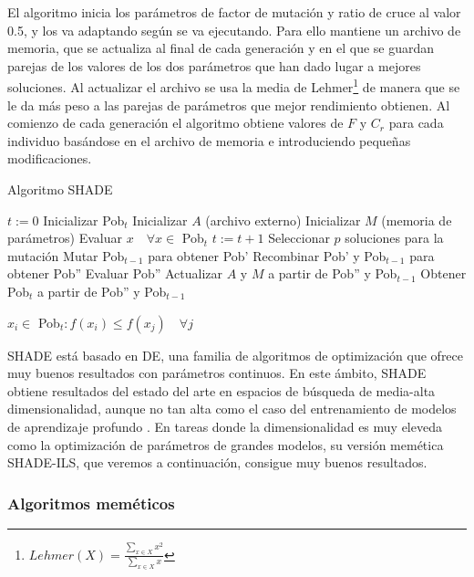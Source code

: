El algoritmo inicia los parámetros de factor de mutación y ratio de cruce al valor 0.5, y los va adaptando según se va ejecutando. Para ello mantiene un archivo de memoria, que se actualiza al final de cada generación y en el que se guardan parejas de los valores de los dos parámetros que han dado lugar a mejores soluciones. Al actualizar el archivo se usa la media de Lehmer\footnote{$Lehmer(X) = \frac{\sum_{x\in X} x^2}{\sum_{x\in X} x}$}  de manera que se le da más peso a las parejas de parámetros que mejor rendimiento obtienen. Al comienzo de cada generación el algoritmo obtiene valores de $F$ y $C_r$ para cada individuo basándose en el archivo de memoria e introduciendo pequeñas modificaciones.


\begin{algorithm}
\caption{Algoritmo SHADE}
\label{alg:shade}
	\begin{algorithmic}
		\State $t:=0$
		\State Inicializar Pob$_t$
		\State Inicializar $A$ (archivo externo)
		\State Inicializar $M$ (memoria de parámetros)
		\State Evaluar $x \quad \forall x \in$ Pob$_t$
			\State $t:=t+1$
			\State Seleccionar $p$ soluciones para la mutación
			\State Mutar Pob$_{t-1}$ para obtener Pob'
			\State Recombinar Pob' y Pob$_{t-1}$ para obtener Pob''
			\State Evaluar Pob''
			\State Actualizar $A$ y $M$ a partir de Pob'' y Pob$_{t-1}$
			\State Obtener Pob$_t$ a partir de Pob'' y Pob$_{t-1}$
		\EndWhile
		
		
		\Return $x_i \in$ Pob$_t : f(x_i) \leq f(x_j) \quad \forall j$
	\end{algorithmic}
\end{algorithm}

SHADE está basado en DE, una familia de algoritmos de optimización que ofrece muy buenos resultados con parámetros continuos. En este ámbito, SHADE obtiene resultados del estado del arte en espacios de búsqueda de media-alta dimensionalidad, aunque no tan alta como el caso del entrenamiento de modelos de aprendizaje profundo \cite{shade}. En tareas donde la dimensionalidad es muy eleveda como la optimización de parámetros de grandes modelos, su versión memética SHADE-ILS, que veremos a continuación, consigue muy buenos resultados.



\subsubsection{Algoritmos meméticos}

